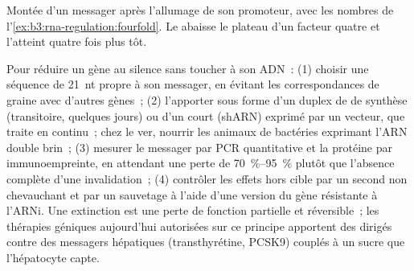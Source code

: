 \begin{omfigure}

{\small Montée d'un messager après l'allumage de son promoteur, avec
les nombres de l'\cref{ex:b3:rna-regulation:fourfold}. Le 
abaisse le plateau d'un facteur quatre et l'atteint quatre fois plus tôt.}
\end{omfigure}

\begin{method}\label{met:b3:rna-regulation:knockdown}
Pour réduire un gène au silence sans toucher à son ADN~: (1) choisir
une séquence de \qty{21}{nt} propre à son messager, en évitant les
correspondances de graine avec d'autres gènes~; (2) l'apporter sous
forme d'un duplex de  de synthèse (transitoire, quelques jours) ou
d'un  court (shARN) exprimé par un vecteur, que
 traite en continu~; chez le ver, nourrir les animaux de bactéries
exprimant l'ARN double brin~; (3) mesurer le messager par PCR
quantitative et la protéine par immunoempreinte, en attendant une perte
de \qtyrange{70}{95}{\%} plutôt que l'absence complète d'une
invalidation~; (4) contrôler les effets hors cible par un second 
non chevauchant et par un sauvetage à l'aide d'une version du gène
résistante à l'ARNi. Une extinction est une perte de fonction
partielle et réversible~; les thérapies géniques aujourd'hui autorisées
sur ce principe apportent des  dirigés contre des messagers
hépatiques (transthyrétine, PCSK9) couplés à un sucre que
l'hépatocyte capte.
\end{method}

